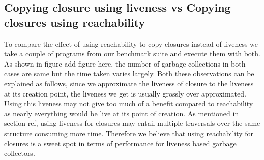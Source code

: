 \documentclass[9pt]{sigplanconf}
\newcommand{\comment}[1]{{\color{Myblue}{(#1)}}}
\begin{document}
\subsection{Copying closure using liveness vs Copying closures using reachability}
To compare the effect of using reachability to copy closures instead of liveness we take a couple of programs from our benchmark suite and execute them with 
both. As shown in figure-add-figure-here, the number of garbage collections 
in both cases are same but the time taken varies largely. Both these observations can be explained as follows, since we approximate the liveness of closure to 
the liveness at its creation point, the liveness we get is usually grossly over approximated. 
Using this liveness may not give too much of a benefit compared to reachability as nearly everything would be live at its point of creation. 
As mentioned in section-ref, using liveness for closures may entail multiple traversals over the same structure consuming more time. 
Therefore we believe that using reachability for closures is a sweet spot in terms of performance for liveness based garbage collectors. 

\end{document}

